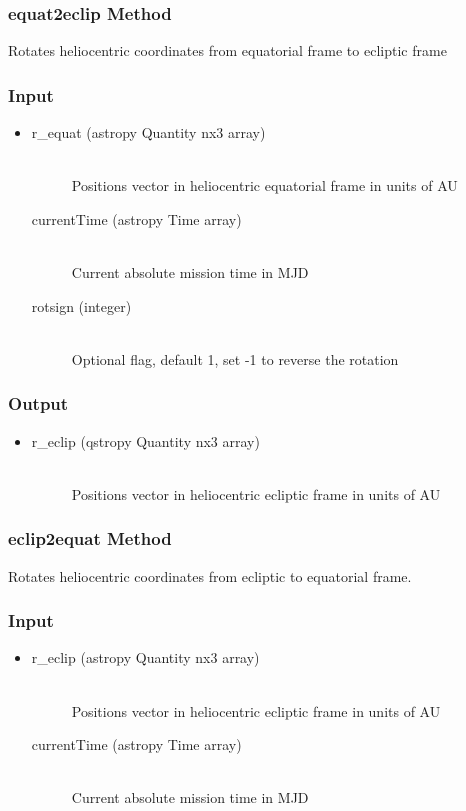 \documentclass[cleanfoot]{asme2ej}
\begin{document}
\subsubsection{equat2eclip Method} \label{sec:equat2eclip}
Rotates heliocentric coordinates from equatorial frame to ecliptic frame
\subsubsection*{Input}
\begin{itemize}
\item
\begin{description}
    \item[r\_equat (astropy Quantity nx3 array)] \hfill \\ Positions vector in heliocentric equatorial frame in units of AU
    \item[currentTime (astropy Time array)] \hfill \\ Current absolute mission time in MJD
    \item[rotsign (integer)] \hfill \\ Optional flag, default 1, set -1 to reverse the rotation
\end{description}
\end{itemize}
\subsubsection*{Output}
\begin{itemize}
\item
\begin{description}
    \item[r\_eclip (qstropy Quantity nx3 array)] \hfill \\ Positions vector in heliocentric ecliptic frame in units of AU
\end{description}
\end{itemize}

\subsubsection{eclip2equat Method} \label{sec:eclip2equat}
Rotates heliocentric coordinates from ecliptic to equatorial frame.
\subsubsection*{Input}
\begin{itemize}
\item
\begin{description}
    \item[r\_eclip (astropy Quantity nx3 array)] \hfill \\ Positions vector in heliocentric ecliptic frame in units of AU
    \item[currentTime (astropy Time array)] \hfill \\ Current absolute mission time in MJD
\end{description}
\end{itemize}
\end{document}
